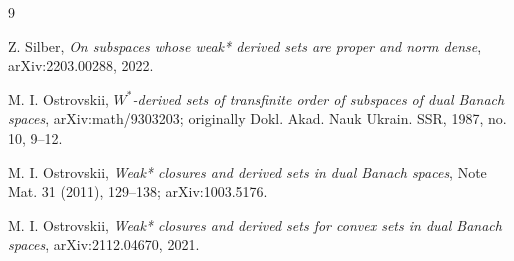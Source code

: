 \documentclass[11pt]{article}
\begin{document}
\begin{thebibliography}{9}

Z. Silber,
\emph{On subspaces whose weak* derived sets are proper and norm dense},
arXiv:2203.00288, 2022.

M. I. Ostrovskii,
\emph{\(W^*\)-derived sets of transfinite order of subspaces of dual Banach
spaces},
arXiv:math/9303203; originally Dokl. Akad. Nauk Ukrain. SSR, 1987, no. 10,
9--12.

M. I. Ostrovskii,
\emph{Weak* closures and derived sets in dual Banach spaces},
Note Mat. 31 (2011), 129--138; arXiv:1003.5176.

M. I. Ostrovskii,
\emph{Weak* closures and derived sets for convex sets in dual Banach spaces},
arXiv:2112.04670, 2021.

\end{thebibliography}
\end{document}
